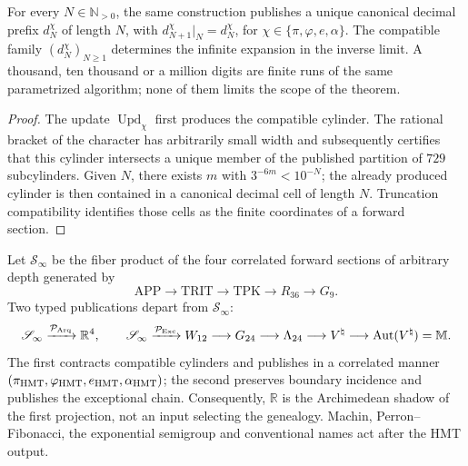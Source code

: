 \begin{corollary}
\label{cor:generacion-nonadica-profundidad-arbitraria-rev10}
For every \(N\in\mathbb N_{>0}\), the same construction publishes a unique
canonical decimal prefix \(d_N^\chi\) of length \(N\), with
\(d_{N+1}^\chi|_N=d_N^\chi\), for
\(\chi\in\{\pi,\varphi,e,\alpha\}\). The compatible family
\((d_N^\chi)_{N\ge1}\) determines the infinite expansion in the inverse
limit. A thousand, ten thousand or a million digits are finite runs of the
same parametrized algorithm; none of them limits the scope of the
theorem.
\end{corollary}

\begin{proof}
The update \(\operatorname{Upd}_\chi\) first produces the compatible
cylinder. The rational bracket of the character has arbitrarily small
width and subsequently certifies that this cylinder intersects a unique member of
the published partition of \(729\) subcylinders. Given \(N\), there exists \(m\) with
\(3^{-6m}<10^{-N}\); the already produced cylinder is then contained in a
canonical decimal cell of length \(N\). Truncation compatibility
identifies those cells as the finite coordinates of a forward section.
\end{proof}

\begin{theorem}
\label{thm:estado-coinductivo-doble-proyeccion-rev10}
Let \(\mathscr S_\infty\) be the fiber product of the four correlated
forward sections of arbitrary depth generated by
\[
 \mathrm{APP}\longrightarrow\mathrm{TRIT}\longrightarrow\mathrm{TPK}
 \longrightarrow R_{36}\longrightarrow G_9.
\]
Two typed publications depart from \(\mathscr S_\infty\):
\[
 \mathscr S_\infty\xrightarrow{\mathcal P_{\rm Arq}}\mathbb R^4,
 \qquad
 \mathscr S_\infty\xrightarrow{\mathcal P_{\rm Exc}}
 W_{12}\longrightarrow G_{24}\longrightarrow\Lambda_{24}
 \longrightarrow V^\natural
 \longrightarrow\operatorname{Aut}(V^\natural)=\mathbb M.
\]
The first contracts compatible cylinders and publishes in a correlated manner
\((\pi_{\rm HMT},\varphi_{\rm HMT},e_{\rm HMT},\alpha_{\rm HMT})\); the
second preserves boundary incidence and publishes the exceptional chain.
Consequently, \(\mathbb R\) is the Archimedean shadow of the first
projection, not an input selecting the genealogy. Machin,
Perron--Fibonacci, the exponential semigroup and conventional
names act after the HMT output.
\end{theorem}

